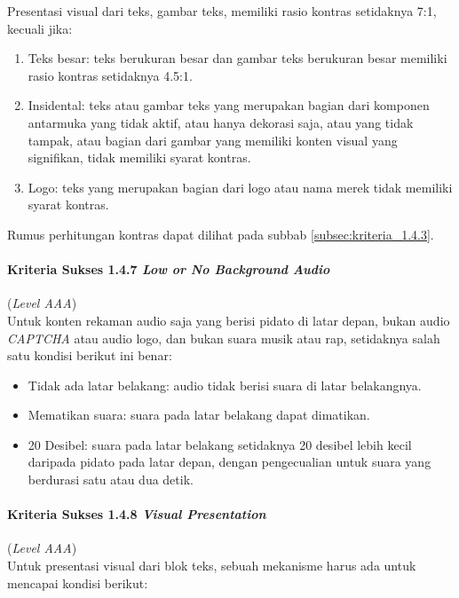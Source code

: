 Presentasi visual dari teks, gambar teks, memiliki rasio kontras setidaknya 7:1, kecuali jika:

\begin{enumerate}
	\item Teks besar: teks berukuran besar dan gambar teks berukuran besar memiliki rasio kontras setidaknya 4.5:1.
	\item Insidental: teks atau gambar teks yang merupakan bagian dari komponen antarmuka yang tidak aktif, atau hanya dekorasi saja, atau yang tidak tampak, atau bagian dari gambar yang memiliki konten visual yang signifikan, tidak memiliki syarat kontras.
	\item Logo: teks yang merupakan bagian dari logo atau nama merek tidak memiliki syarat kontras.
\end{enumerate}

Rumus perhitungan kontras dapat dilihat pada subbab \ref{subsec:kriteria_1.4.3}.

\paragraph{Kriteria Sukses 1.4.7 \textit{Low or No Background Audio}}
\label{subsec:kriteria_1.4.7}
(\textit{Level AAA}) \\

Untuk konten rekaman audio saja yang berisi pidato di latar depan, bukan audio \textit{CAPTCHA} atau audio logo, dan bukan suara musik atau rap, setidaknya salah satu kondisi berikut ini benar: 

\begin{itemize}
	\item Tidak ada latar belakang: audio tidak berisi suara di latar belakangnya.
	\item Mematikan suara: suara pada latar belakang dapat dimatikan.
	\item 20 Desibel: suara pada latar belakang setidaknya 20 desibel lebih kecil daripada pidato pada latar depan, dengan pengecualian untuk suara yang berdurasi satu atau dua detik.
\end{itemize}

\paragraph{Kriteria Sukses 1.4.8 \textit{Visual Presentation}}
\label{subsec:kriteria_1.4.8}
(\textit{Level AAA}) \\

Untuk presentasi visual dari blok teks, sebuah mekanisme harus ada untuk mencapai kondisi berikut:

